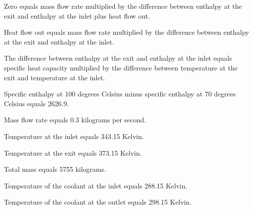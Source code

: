 Zero equals mass flow rate multiplied by the difference between enthalpy at the exit and enthalpy at the inlet plus heat flow out.  

Heat flow out equals mass flow rate multiplied by the difference between enthalpy at the exit and enthalpy at the inlet.  

The difference between enthalpy at the exit and enthalpy at the inlet equals specific heat capacity multiplied by the difference between temperature at the exit and temperature at the inlet.  

Specific enthalpy at 100 degrees Celsius minus specific enthalpy at 70 degrees Celsius equals 2626.9.  

Mass flow rate equals 0.3 kilograms per second.  

Temperature at the inlet equals 343.15 Kelvin.  

Temperature at the exit equals 373.15 Kelvin.  

Total mass equals 5755 kilograms.  

Temperature of the coolant at the inlet equals 288.15 Kelvin.  

Temperature of the coolant at the outlet equals 298.15 Kelvin.